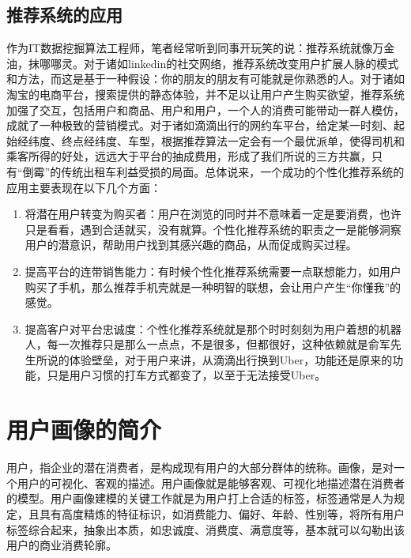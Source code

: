 	\subsection{推荐系统的应用}
	作为IT数据挖掘算法工程师，笔者经常听到同事开玩笑的说：推荐系统就像万金油，抹哪哪灵。对于诸如linkedin的社交网络，推荐系统改变用户扩展人脉的模式和方法，而这是基于一种假设：你的朋友的朋友有可能就是你熟悉的人。对于诸如淘宝的电商平台，搜索提供的静态体验，并不足以让用户产生购买欲望，推荐系统加强了交互，包括用户和商品、用户和用户，一个人的消费可能带动一群人模仿，成就了一种极致的营销模式。对于诸如滴滴出行的网约车平台，给定某一时刻、起始经纬度、终点经纬度、车型，根据推荐算法一定会有一个最优派单，使得司机和乘客所得的好处，远远大于平台的抽成费用，形成了我们所说的三方共赢，只有“倒霉”的传统出租车利益受损的局面。总体说来，一个成功的个性化推荐系统的应用主要表现在以下几个方面：
	\begin{enumerate}[(1)]
	\item 将潜在用户转变为购买者：用户在浏览的同时并不意味着一定是要消费，也许只是看看，遇到合适就买，没有就算。个性化推荐系统的职责之一是能够洞察用户的潜意识，帮助用户找到其感兴趣的商品，从而促成购买过程。
	\item 提高平台的连带销售能力：有时候个性化推荐系统需要一点联想能力，如用户购买了手机，那么推荐手机壳就是一种明智的联想，会让用户产生“你懂我”的感觉。
	\item 提高客户对平台忠诚度：个性化推荐系统就是那个时时刻刻为用户着想的机器人，每一次推荐只是那么一点点，不是很多，但都很好，这种依赖就是俞军先生所说的体验壁垒，对于用户来讲，从滴滴出行换到Uber，功能还是原来的功能，只是用户习惯的打车方式都变了，以至于无法接受Uber。
	\end{enumerate}

\section{用户画像的简介}
	用户，指企业的潜在消费者，是构成现有用户的大部分群体的统称。画像，是对一个用户的可视化、客观的描述。用户画像就是能够客观、可视化地描述潜在消费者的模型。用户画像建模的关键工作就是为用户打上合适的标签，标签通常是人为规定，且具有高度精炼的特征标识，如消费能力、偏好、年龄、性别等，将所有用户标签综合起来，抽象出本质，如忠诚度、消费度、满意度等，基本就可以勾勒出该用户的商业消费轮廓。
